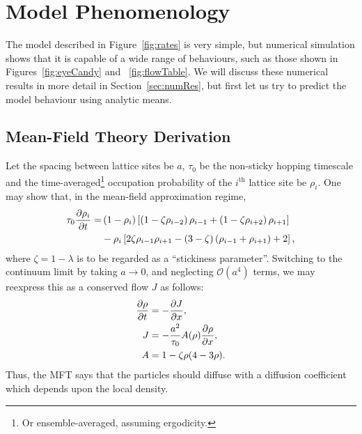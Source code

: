 \section{Model Phenomenology}
The model described in Figure~\ref{fig:rates} is very simple, but numerical simulation shows that it is capable of a wide range of behaviours, such as those shown in Figures~\ref{fig:eyeCandy} and ~\ref{fig:flowTable}. We will discuss
these numerical results in more detail in Section~\ref{sec:numRes}, but first let us try to predict the model behaviour using analytic means.

\subsection{Mean-Field Theory Derivation}
Let the spacing between lattice sites be $a$, $\tau_0$ be the non-sticky hopping timescale and the time-averaged\footnote{Or ensemble-averaged, assuming ergodicity.} occupation probability of the $i^{\mathrm{th}}$ lattice site be $\rho_i$. 
One may show that, in the mean-field approximation regime,
\begin{align*}
 \tau_0 \frac{\partial \rho_i}{\partial t} = &\left( 1-\rho_i \right) \left[ \left(1-\zeta\rho_{i-2} \right) \rho_{i-1} + \left(1-\zeta\rho_{i+2} \right) \rho_{i+1} \right] \\
 &- \rho_i \left[ 2 \zeta \rho_{i-1} \rho_{i+1}  - (3-\zeta)\left(\rho_{i-1} + \rho_{i+1}\right) + 2 \right],\\
\end{align*}
where $\zeta = 1-\lambda$ is to be regarded as a ``stickiness parameter''. Switching to the continuum limit by taking $a\rightarrow 0$, and neglecting $\mathcal{O}(a^4)$ terms, we may reexpress this as a conserved flow $J$ as follows:
\begin{align*}
 \frac{\partial \rho}{\partial t} &= - \frac{\partial J}{\partial x}, \\
 J &= - \frac{a^2}{\tau_0} A(\rho) \frac{\partial \rho}{\partial x}, \\
 A &= 1 - \zeta \rho(4-3\rho). \\
\end{align*}
Thus, the MFT says that the particles should diffuse with a diffusion coefficient which depends upon the local density.
